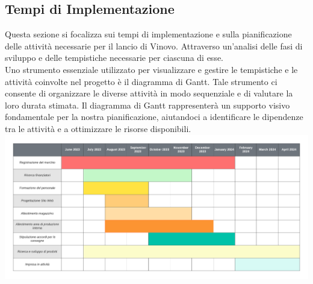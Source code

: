 \documentclass[12pt, a4paper]{article}
\newcommand{\meskip}{\medskip \\}
\begin{document}
\subsection{Tempi di Implementazione}
Questa sezione si focalizza sui tempi di implementazione e sulla pianificazione delle attività necessarie per il lancio di Vinovo. Attraverso un'analisi delle fasi di sviluppo e delle tempistiche necessarie per ciascuna di esse.\meskip
Uno strumento essenziale utilizzato per visualizzare e gestire le tempistiche e le attività coinvolte nel progetto è il diagramma di Gantt. Tale strumento ci consente di organizzare le diverse attività in modo sequenziale e di valutare la loro durata stimata. Il diagramma di Gantt rappresenterà un supporto visivo fondamentale per la nostra pianificazione, aiutandoci a identificare le dipendenze tra le attività e a ottimizzare le risorse disponibili.\meskip
\includegraphics[width=\textwidth]{images/Diagramma_di_Gantt_di_base_1.pdf}
\end{document}
